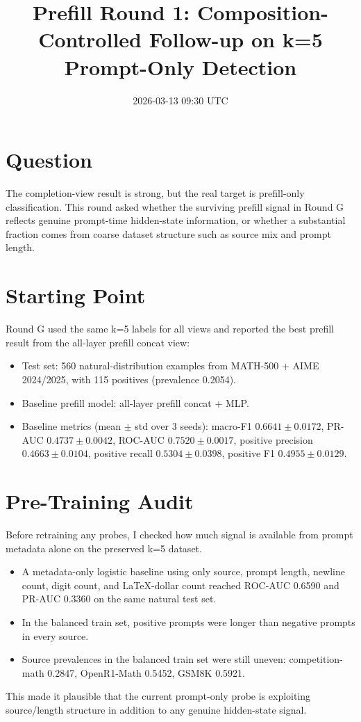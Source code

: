 \documentclass[11pt]{article}
\title{Prefill Round 1: Composition-Controlled Follow-up on k=5 Prompt-Only Detection}
\author{}
\date{2026-03-13 09:30 UTC}
\begin{document}
\maketitle

\section*{Question}
The completion-view result is strong, but the real target is prefill-only classification.
This round asked whether the surviving prefill signal in Round G reflects genuine prompt-time hidden-state information, or whether a substantial fraction comes from coarse dataset structure such as source mix and prompt length.

\section*{Starting Point}
Round G used the same k=5 labels for all views and reported the best prefill result from the all-layer prefill concat view:
\begin{itemize}
  \item Test set: 560 natural-distribution examples from MATH-500 + AIME 2024/2025, with 115 positives (prevalence 0.2054).
  \item Baseline prefill model: all-layer prefill concat + MLP.
  \item Baseline metrics (mean $\pm$ std over 3 seeds): macro-F1 $0.6641 \pm 0.0172$, PR-AUC $0.4737 \pm 0.0042$, ROC-AUC $0.7520 \pm 0.0017$, positive precision $0.4663 \pm 0.0104$, positive recall $0.5304 \pm 0.0398$, positive F1 $0.4955 \pm 0.0129$.
\end{itemize}

\section*{Pre-Training Audit}
Before retraining any probes, I checked how much signal is available from prompt metadata alone on the preserved k=5 dataset.
\begin{itemize}
  \item A metadata-only logistic baseline using only source, prompt length, newline count, digit count, and LaTeX-dollar count reached ROC-AUC 0.6590 and PR-AUC 0.3360 on the same natural test set.
  \item In the balanced train set, positive prompts were longer than negative prompts in every source.
  \item Source prevalences in the balanced train set were still uneven: competition-math 0.2847, OpenR1-Math 0.5452, GSM8K 0.5921.
\end{itemize}
This made it plausible that the current prompt-only probe is exploiting source/length structure in addition to any genuine hidden-state signal.
\end{document}
